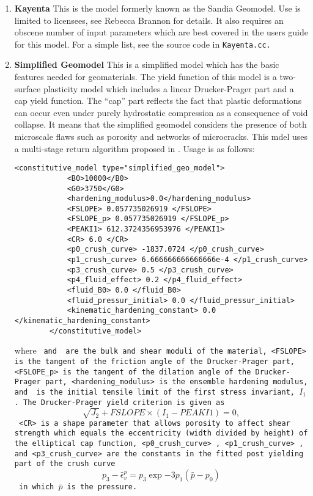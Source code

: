 \begin{enumerate}
\item{\bf Kayenta} This is the model formerly known as the Sandia Geomodel.  Use
is limited to licensees, see Rebecca Brannon for details.  It also requires
an obscene number of input parameters which are best covered in the users
guide for this model.  For a simple list, see the source code in
\tt Kayenta.cc. \normalfont

\item{\bf Simplified Geomodel} This is a simplified model which has the basic features
needed for geomaterials. The yield function of this model is a two-surface plasticity model 
which includes a linear Drucker-Prager part and a cap yield function. The “cap” part reflects
the fact that plastic deformations can occur even under purely hydrostatic compression as
a consequence of void collapse. It means that the simplified geomodel considers the presence 
of both microscale flaws such as porosity and networks of microcracks. This mdel uses a 
multi-stage return algorithm proposed in \cite{brannon10}. Usage is as follows:
\begin{Verbatim}[fontsize=\footnotesize]
        <constitutive_model type="simplified_geo_model">
            <B0>10000</B0>
            <G0>3750</G0>
            <hardening_modulus>0.0</hardening_modulus>
            <FSLOPE> 0.057735026919 </FSLOPE>
            <FSLOPE_p> 0.057735026919 </FSLOPE_p>
            <PEAKI1> 612.3724356953976 </PEAKI1>
            <CR> 6.0 </CR>
            <p0_crush_curve> -1837.0724 </p0_crush_curve>
            <p1_crush_curve> 6.666666666666666e-4 </p1_crush_curve>
            <p3_crush_curve> 0.5 </p3_crush_curve>
            <p4_fluid_effect> 0.2 </p4_fluid_effect>
            <fluid_B0> 0.0 </fluid_B0>
            <fluid_pressur_initial> 0.0 </fluid_pressur_initial>
            <kinematic_hardening_constant> 0.0 </kinematic_hardening_constant>
        </constitutive_model>
\end{Verbatim}
where \tt <B0> \normalfont and \tt <G0> \normalfont are the bulk and 
shear moduli of the material, \tt <FSLOPE> \normalfont is the tangent of the friction angle 
of the Drucker-Prager part, \tt <FSLOPE\_p> \normalfont is the tangent of the dilation angle 
of the Drucker-Prager part, \tt <hardening\_modulus> \normalfont is the ensemble hardening 
modulus, and \tt <PEAKI1> \normalfont is the initial tensile limit of the 
first stress invariant, $I_1$. The Drucker-Prager yield criterion is given as
\begin{equation}
\sqrt{J_2}+FSLOPE \times (I_1-PEAKI1)=0,
\end{equation}
\tt <CR> \normalfont is a shape parameter that allows porosity to affect shear
strength which equals the eccentricity (width divided by
height) of the elliptical cap function, \tt <p0\_crush\_curve> 
\normalfont, \tt <p1\_crush\_curve> \normalfont, and \tt <p3\_crush\_curve> \normalfont are the
constants in the fitted post yielding part of the crush curve
\begin{equation}
p_3-\bar{\epsilon}_v^p=p_3\exp{-3p_1(\bar{p}-p_0)}
\end{equation}
in which $\bar{p}$ is the pressure.


\end{enumerate}
